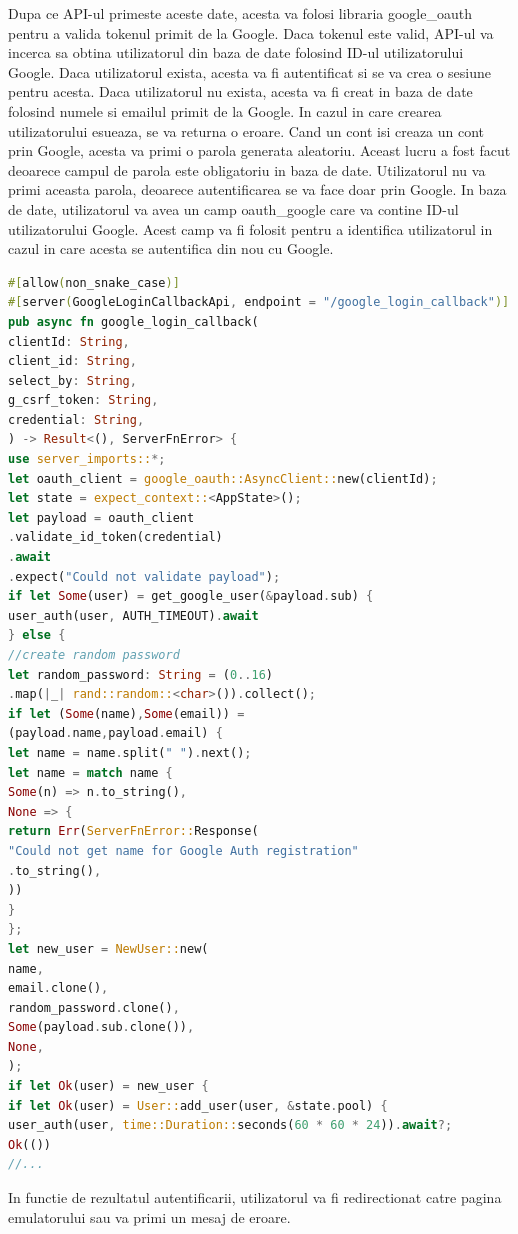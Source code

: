 \documentclass[titlepage,12pt]{article}
\DeclareRobustCommand{\code}[1]{{\ttfamily\small #1}}
\begin{document}
Dupa ce API-ul primeste aceste date, acesta va folosi libraria \code{google\_oauth} pentru a valida tokenul primit de la Google. Daca tokenul este valid, API-ul va incerca sa obtina utilizatorul din baza de date folosind ID-ul utilizatorului Google. Daca utilizatorul exista, acesta va fi autentificat si se va crea o sesiune pentru acesta. Daca utilizatorul nu exista, acesta va fi creat in baza de date folosind numele si emailul primit de la Google. In cazul in care crearea utilizatorului esueaza, se va returna o eroare.
Cand un cont isi creaza un cont prin Google, acesta va primi o parola generata aleatoriu. Aceast lucru a fost facut deoarece campul de parola este obligatoriu in baza de date. Utilizatorul nu va primi aceasta parola, deoarece autentificarea se va face doar prin Google.
In baza de date, utilizatorul va avea un camp \code{oauth\_google} care va contine ID-ul utilizatorului Google. Acest camp va fi folosit pentru a identifica utilizatorul in cazul in care acesta se autentifica din nou cu Google.
\begin{lstlisting}[language=Rust,caption={API pentru autentificarea cu Google},label={lst:googleloginapi}]
#[allow(non_snake_case)]
#[server(GoogleLoginCallbackApi, endpoint = "/google_login_callback")]
pub async fn google_login_callback(
clientId: String,
client_id: String,
select_by: String,
g_csrf_token: String,
credential: String,
) -> Result<(), ServerFnError> {
use server_imports::*;
let oauth_client = google_oauth::AsyncClient::new(clientId);
let state = expect_context::<AppState>();
let payload = oauth_client
.validate_id_token(credential)
.await
.expect("Could not validate payload");
if let Some(user) = get_google_user(&payload.sub) {
user_auth(user, AUTH_TIMEOUT).await
} else {
//create random password
let random_password: String = (0..16)
.map(|_| rand::random::<char>()).collect();
if let (Some(name),Some(email)) =
(payload.name,payload.email) {
let name = name.split(" ").next();
let name = match name {
Some(n) => n.to_string(),
None => {
return Err(ServerFnError::Response(
"Could not get name for Google Auth registration"
.to_string(),
))
}
};
let new_user = NewUser::new(
name,
email.clone(),
random_password.clone(),
Some(payload.sub.clone()),
None,
);
if let Ok(user) = new_user {
if let Ok(user) = User::add_user(user, &state.pool) {
user_auth(user, time::Duration::seconds(60 * 60 * 24)).await?;
Ok(())
//...
\end{lstlisting}

In functie de rezultatul autentificarii, utilizatorul va fi redirectionat catre pagina emulatorului sau va primi un mesaj de eroare.
\end{document}
